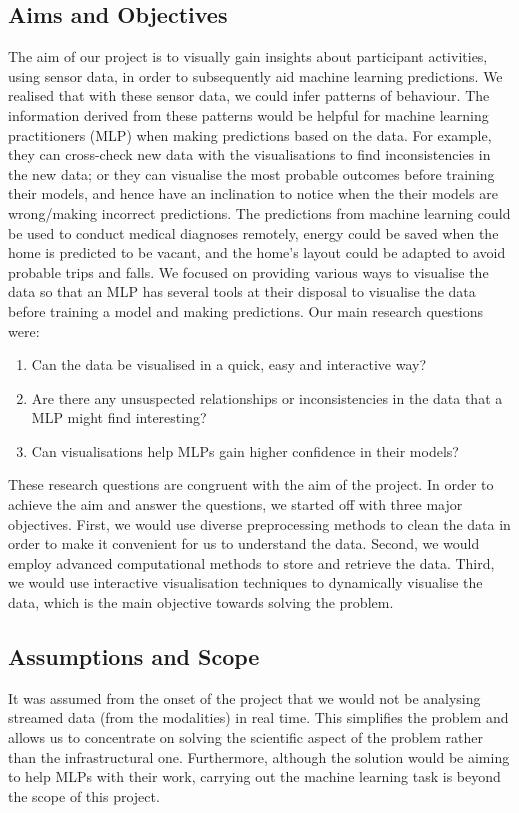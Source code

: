 \documentclass[fleqn,10pt]{SelfArx} %
\begin{document}
	\subsection{Aims and Objectives}
The aim of our project is to visually gain insights about participant activities, using sensor data, in order to subsequently aid machine learning predictions. We realised that with these sensor data, we could infer patterns of behaviour. The information derived from these patterns would be helpful for machine learning practitioners (MLP) when making predictions based on the data. For example, they can cross-check new data with the visualisations to find inconsistencies in the new data; or they can visualise the most probable outcomes before training their models, and hence have an inclination to notice when the their models are wrong/making incorrect predictions. The predictions from machine learning could be used to conduct medical diagnoses remotely, energy could be saved when the home is predicted to be vacant, and the home’s layout could be adapted to avoid probable trips and falls. We focused on providing various ways to visualise the data so that an MLP has several tools at their disposal to visualise the data before training a model and making predictions. Our main research questions were:
\begin{enumerate}
\item Can the data be visualised in a quick, easy and interactive way?
\item Are there any unsuspected relationships or inconsistencies in the data that a MLP might find interesting?
\item Can visualisations help MLPs gain higher confidence in their models?
\end{enumerate}
These research questions are congruent with the aim of the project. In order to achieve the aim and answer the questions, we started off with three major objectives. First, we would use diverse preprocessing methods to clean the data in order to make it convenient for us to understand the data. Second, we would employ advanced computational methods to store and retrieve the data. Third, we would use interactive visualisation techniques to dynamically visualise the data, which is the main objective towards solving the problem. \\

	\subsection{Assumptions and Scope}
It was assumed from the onset of the project that we would not be analysing streamed data (from the modalities) in real time. This simplifies the problem and allows us to concentrate on solving the scientific aspect of the problem rather than the infrastructural one. Furthermore, although the solution would be aiming to help MLPs with their work, carrying out the machine learning task is beyond the scope of this project. \\
\end{document}
